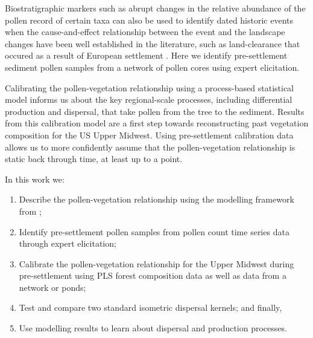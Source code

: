 \documentclass[12pt]{article}
\begin{document}

Biostratigraphic markers such as abrupt changes in the relative
abundance of the pollen record of certain taxa can also be used to
identify dated historic events when the cause-and-effect relationship
between the event and the landscape changes have been well established
in the literature, such as land-clearance that occured as a result of
European settlement \citep{XXX}. Here we identify pre-settlement
sediment pollen samples from a network of pollen cores using expert
elicitation.


Calibrating the pollen-vegetation relationship using a process-based
statistical model informs us about the key regional-scale processes,
including differential production and dispersal, that take pollen from
the tree to the sediment. Results from this calibration model are a
first step towards reconstructing past vegetation composition for the
US Upper Midwest. Using pre-settlement calibration data allows us to
more confidently assume that the pollen-vegetation relationship is
static back through time, at least up to a point.

In this work we:
\begin{enumerate}
\item Describe the pollen-vegetation relationship using the modelling framework from \citet{paciorek2009mapping}; 
\item Identify pre-settlement pollen samples from pollen count time series data through expert elicitation;
\item Calibrate the pollen-vegetation relationship for the Upper Midwest during pre-settlement using PLS forest composition data as well as data from a network or ponds;
\item Test and compare two standard isometric dispersal kernels; and finally, 
\item Use modelling results to learn about dispersal and production processes.
\end{enumerate}
\end{document}
